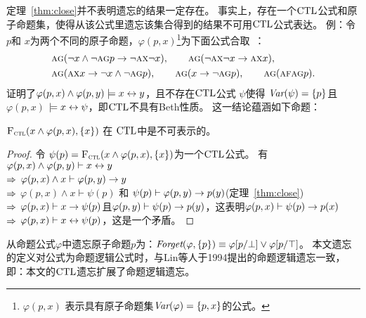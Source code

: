 定理~\ref{thm:close}并不表明遗忘的结果一定存在。
事实上，存在一个$\textrm{CTL}$公式和原子命题集，使得从该公式里遗忘该集合得到的结果不可用$\textrm{CTL}$公式表达。
例：令$p$和 $x$为两个不同的原子命题，$\varphi(p,x)$\footnote{$\varphi(p,x)$ 表示具有原子命题集$\textit{Var}(\varphi)=\{p,x\}$的公式。}为下面公式合取~\cite{Maksimova:JANCL:1991}：
\begin{align*}
	&\textsc{a}\textsc{g}(\neg x \wedge \neg \textsc{a} \textsc{g} p \rightarrow \neg \textsc{a} \textsc{x} \neg x),
	\qquad \textsc{a}\textsc{g}(\neg \textsc{a}\textsc{x} \neg x \rightarrow \textsc{a} \textsc{x} x),\\
	& \textsc{a}\textsc{g}(\textsc{a}\textsc{x} x \rightarrow \neg x \wedge \neg \textsc{a} \textsc{g} p),
	\qquad \textsc{a}\textsc{g}(x \rightarrow \neg \textsc{a}\textsc{g} p),
	\qquad \textsc{a}\textsc{g}(\textsc{a} \textsc{f} \textsc{a} \textsc{g} p).
\end{align*}
\citeauthor{Maksimova:JANCL:1991}证明了$\varphi(p,x)\land \varphi(p,y)\models x\leftrightarrow y$，且不存在$\textrm{CTL}$公式 $\psi$使得 $\textit{Var}(\psi)=\{p\}$且$\varphi(p,x)$ $\models x\leftrightarrow \psi$，即$\textrm{CTL}$不具有Beth性质。
这一结论蕴涵如下命题：
\begin{proposition}\label{pro:uniforget}
	${\textsc{F}_{\textsc{ctl}}}(x\land \varphi(p,x), \{x\})$ 在 $\textrm{CTL}$中是不可表示的。
\end{proposition}
\begin{proof}
	令 $\psi(p)={\textsc{F}_{\textsc{ctl}}}(x\land \varphi(p,x), \{x\})$为一个$\textrm{CTL}$公式。
	有 \\
	$\varphi(p,x)\land \varphi(p,y)\vdash x\leftrightarrow y$\\
	$\Rightarrow$ $\varphi(p,x)\land x \vdash \varphi(p,y)\rightarrow y$\\
	$\Rightarrow$ $\varphi(p,x)\land x\vdash \psi(p)$ 和 $\psi(p)\vdash \varphi(p,y)\rightarrow p(y)$\hfill (定理~\ref{thm:close})\\
	$\Rightarrow$ $\varphi(p,x)\vdash x\rightarrow\psi(p)$且$\varphi(p,y)\vdash \psi(p)\rightarrow p(y)$，这表明$\varphi(p,x)\vdash \psi(p)\rightarrow p(x)$\\
	$\Rightarrow$ $\varphi(p,x)\vdash x\leftrightarrow \psi(p)$，这是一个矛盾。
\end{proof}




从命题公式$\varphi$中遗忘原子命题$p$为：$\textit{Forget}(\varphi,\{p\})\equiv\varphi[p/\bot] \vee \varphi[p/\top]$。
本文遗忘的定义对公式为命题逻辑公式时，与Lin等人于1994提出的命题逻辑遗忘一致，即：本文的$\textrm{CTL}$遗忘扩展了命题逻辑遗忘。%

